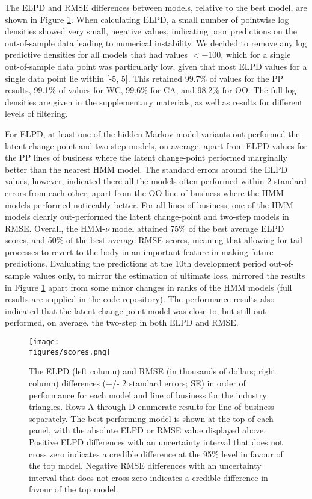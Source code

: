 The ELPD and RMSE differences between models, relative to
the best model,
are shown in Figure \ref{fig:backtest-scores}.
When calculating ELPD, a small number of pointwise log densities 
showed very small, negative values, indicating poor predictions
on the out-of-sample data leading to numerical instability. 
We decided to remove any log predictive
densities for all models that had values $< -100$, which for a single
out-of-sample data point was particularly low, given that most
ELPD values for a single data point lie within [-5, 5]. This retained 99.7\%
of values for the PP results, 99.1\% of values for WC, 99.6\%
for CA, and 98.2\% for OO. The full log densities are given in the
supplementary materials, as well as results for different levels
of filtering.

For ELPD, at least one of the
hidden Markov model variants out-performed
the latent change-point and 
two-step models, on average, 
apart from ELPD values for the PP
lines of business where the latent change-point
performed marginally better than the nearest
HMM model. The standard errors around the ELPD
values, however, indicated there all the models
often performed within 2 standard errors from each other,
apart from the OO line of business where the HMM models
performed noticeably better.
For all lines of business, one of the HMM 
models clearly out-performed the latent change-point
and two-step models in RMSE.
Overall, the HMM-$\nu$ model attained
75\% of the best average ELPD scores, and 50\%
of the best average RMSE scores, meaning that
allowing for tail processes to revert
to the body in an important feature in making
future predictions.
Evaluating the predictions at the 10th
development period
out-of-sample values only, to mirror
the estimation of ultimate loss,
mirrored the results in Figure
\ref{fig:backtest-scores} apart from some
minor changes in ranks of the HMM
models (full results are supplied
in the code repository).
The performance results also indicated
that the latent change-point model
was close to, but still out-performed,
on average, the two-step in both ELPD and RMSE.


\begin{figure}
    \centering
    \texttt{[image: \\figures/scores.png]}
    \caption{
        The ELPD (left column) and RMSE (in thousands of dollars; right column)
		differences (+/- 2 standard errors; SE) in order of performance
        for each model and line of business for the industry
        triangles. Rows A through D enumerate results
        for line of business separately.
        The best-performing model is shown at the top of each
        panel, with the absolute ELPD or RMSE value displayed above.
        Positive ELPD differences with an uncertainty interval that does not
        cross zero indicates a credible difference at the 95\% level
        in favour of the top model.
        Negative RMSE differences with an uncertainty interval
        that does not cross zero indicates a credible difference
        in favour of the top model.
    }
	\label{fig:backtest-scores}
\end{figure}

